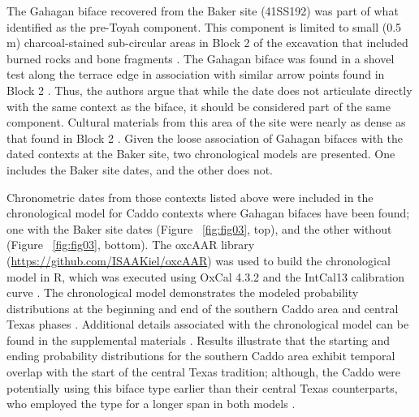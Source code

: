 \documentclass[review]{elsarticle}
\begin{document}
The Gahagan biface recovered from the Baker site (41SS192) was part of what \citet{RN20909} identified as the pre-Toyah component. This component is limited to small (0.5 m) charcoal-stained sub-circular areas in Block 2 of the excavation that included burned rocks and bone fragments \citep{RN20909}. The Gahagan biface was found in a shovel test along the terrace edge in association with similar arrow points found in Block 2 \citep{RN20909}. Thus, the authors argue that while the date does not articulate directly with the same context as the biface, it should be considered part of the same component. Cultural materials from this area of the site were nearly as dense as that found in Block 2 \citep{RN20909}. Given the loose association of Gahagan bifaces with the dated contexts at the Baker site, two chronological models are presented. One includes the Baker site dates, and the other does not.

Chronometric dates from those contexts listed above were included in the chronological model for Caddo contexts where Gahagan bifaces have been found; one with the Baker site dates (Figure ~\ref{fig:fig03}, top), and the other without (Figure ~\ref{fig:fig03}, bottom). The oxcAAR library (\href{https://github.com/ISAAKiel/oxcAAR}{https://github.com/ISAAKiel/oxcAAR}) was used to build the chronological model in R, which was executed using OxCal 4.3.2 \citep{RN5514,RN20716} and the IntCal13 calibration curve \citep{RN4406}. The chronological model demonstrates the modeled probability distributions at the beginning and end of the southern Caddo area and central Texas phases \citep{RN20850}. Additional details associated with the chronological model can be found in the supplemental materials \citep{RN20850}. Results illustrate that the starting and ending probability distributions for the southern Caddo area exhibit temporal overlap with the start of the central Texas tradition; although, the Caddo were potentially using this biface type earlier than their central Texas counterparts, who employed the type for a longer span in both models \citep{RN20850}.
\end{document}
